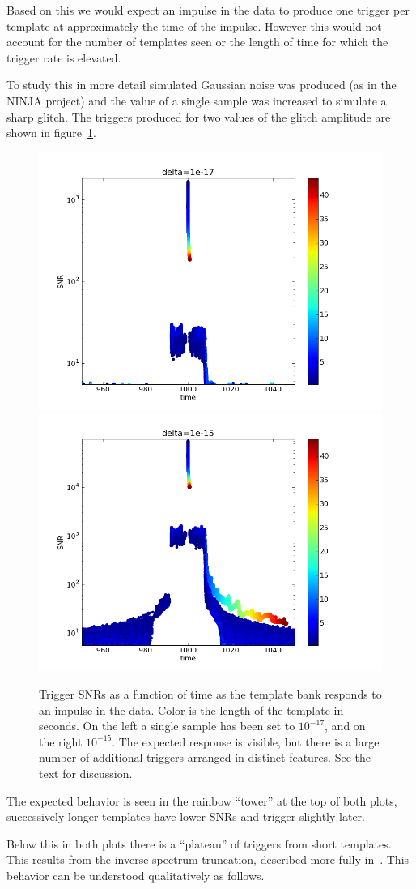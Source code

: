 Based on this we would expect an impulse in the data to produce one
trigger per template at approximately the time of the impulse.
However this would not account for the number of templates seen or the
length of time for which the trigger rate is elevated. 

To study this in more detail simulated Gaussian noise was produced (as
in the NINJA project) and the value of a single sample was increased to
simulate a sharp glitch.  The triggers produced for two values of the
glitch amplitude are shown in
figure~\ref{f:impulses_original_no_chisq}.

\begin{figure}
  \includegraphics[width=0.5\linewidth]{figures/detchar/raw1_1e-17}
  \includegraphics[width=0.5\linewidth]{figures/detchar/raw1_1e-15}
  \caption[Response of the template bank to an impulse] {
  \label{f:impulses_original_no_chisq}
Trigger SNRs as a function of time as the template bank responds to an
impulse in the data.  Color is the length of the template in seconds.
On the left a single sample has been set to $10^{-17}$, and on the
right $10^{-15}$.  The expected response is visible, but there is a
large number of additional triggers arranged in distinct features.
See the text for discussion.
}
\end{figure}%

The expected behavior is seen in the rainbow ``tower'' at the top of
both plots, successively longer templates have lower SNRs and trigger
slightly later.

Below this in both plots there is a ``plateau'' of triggers from short
templates.  This results from the inverse spectrum truncation,
described more fully in~\cite{findchirp}.  This behavior can be
understood qualitatively as follows.

